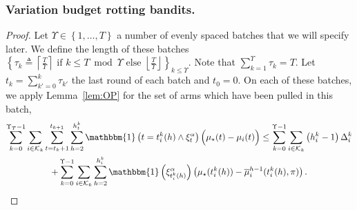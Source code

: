 \subsubsection*{Variation budget rotting bandits.}
\restabudgettheorem* 
\begin{proof}
Let $\Upsilon \in \left\{1, \dots, T\right\}$ a number of evenly spaced batches that we will specify later. We define the length of these batches $\left\{\tau_{k} \triangleq\left\lceil\frac{T}{\Upsilon}\right\rceil \text { if } k \leq T \bmod \Upsilon \text { else }\left\lfloor\frac{T}{\Upsilon}\right\rfloor\right\}_{k \leq \Upsilon}$. Note that $\sum_{k=1}^{\Upsilon} \tau_k = T$. Let $t_k = \sum_{k'=0}^k \tau_{k'}$ the last round of each batch and $t_0 = 0$. On each of these batches, we apply Lemma~\ref{lem:OP} for the set of arms which have been pulled in this batch,
\begin{multline}
\label{eq:op_decomposition}
    \sum_{k=0}^{\Upsilon_T-1} \sum_{i\in\arms_k}\sum_{t=t_{k}+1}^{t_{k+1}} \sum_{h=2}^{h_{t}^{k}} \mathbbm{1}\left( t=t_{i}^{k}(h) \land \HPevent\right)\Big(\mu_{\star}(t)-\mu_{i}(t)\Big)
\leq \sum_{k=0}^{\Upsilon-1} \sum_{i\in\arms_k} \pa{h_i^k-1}\Delta_i^k\\
+ \sum_{k=0}^{\Upsilon-1} \sum_{i\in\arms_k}\sum_{h=2}^{h^k_{i}}\mathbbm{1}\left(\HPt{t_i^k(h)}\right)\pa{  \mu_{\star}(t_i^k(h)) - \bar{\mu}_i^{h-1}(t_i^k(h), \pi)}.
\end{multline}


\end{proof}
